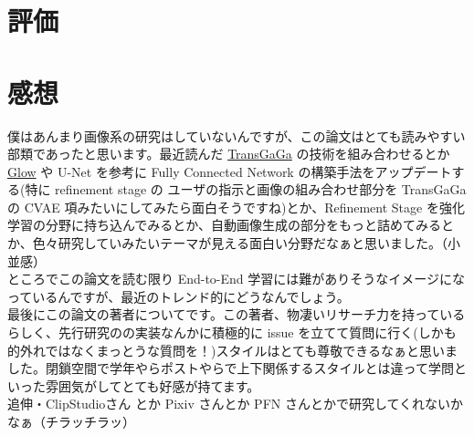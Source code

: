 \documentclass[a4paper, dvipdfmx, 10pt]{article}
\begin{document}
\section{評価}
\label{sec:org6ac0408}
\section{感想}
\label{sec:org35eae1c}
僕はあんまり画像系の研究はしていないんですが、この論文はとても読みやすい部類であったと思います。最近読んだ \href{https://arxiv.org/abs/1904.09571}{TransGaGa} の技術を組み合わせるとか \href{https://arxiv.org/abs/1807.03039}{Glow} や U-Net を参考に Fully Connected Network の構築手法をアップデートする(特に refinement stage の ユーザの指示と画像の組み合わせ部分を TransGaGa の CVAE 項みたいにしてみたら面白そうですね)とか、Refinement Stage を強化学習の分野に持ち込んでみるとか、自動画像生成の部分をもっと詰めてみるとか、色々研究していみたいテーマが見える面白い分野だなぁと思いました。（小並感）\\

ところでこの論文を読む限り End-to-End 学習には難がありそうなイメージになっているんですが、最近のトレンド的にどうなんでしょう。\\

最後にこの論文の著者についてです。この著者、物凄いリサーチ力を持っているらしく、先行研究のの実装なんかに積極的に issue を立てて質問に行く(しかも的外れではなくまっとうな質問を！)スタイルはとても尊敬できるなぁと思いました。閉鎖空間で学年やらポストやらで上下関係するスタイルとは違って学問といった雰囲気がしてとても好感が持てます。\\

追伸・ClipStudioさん とか Pixiv さんとか PFN さんとかで研究してくれないかなぁ（チラッチラッ）\\
\end{document}
